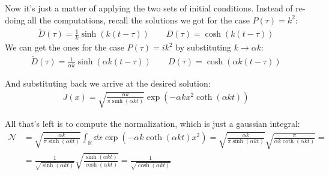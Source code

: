 \documentclass[../template.tex]{subfiles}
\begin{document}
\begin{exo}
    Now it's just a matter of applying the two sets of initial conditions. Instead of re-doing all the computations, recall the solutions we got for the case $P(\tau) = k^2$:
    \begin{align*}
        \tilde{D}(\tau) = \frac{1}{k} \sinh(k(t-\tau)) \qquad D(\tau) = \cosh(k(t-\tau))
    \end{align*}
    We can get the ones for the case $P(\tau) = ik^2$ by substituting $k \to \alpha k$:
    \begin{align*}
        \tilde{D}(\tau) = \frac{1}{\alpha k} \sinh(\alpha k(t- \tau)) \qquad D(\tau) = \cosh(\alpha k(t-\tau)) 
    \end{align*}

    And substituting back we arrive at the desired solution:
    \begin{align*}
        J(x) = \sqrt{\frac{\alpha k}{\pi \sinh(\alpha k t)}} \exp\left(-\alpha k x^2 \coth (\alpha k t) \right)
    \end{align*}

    All that's left is to compute the normalization, which is just a gaussian integral:
    \begin{align*}
        \mathcal{N}&=\sqrt{\frac{\alpha k}{\pi \sinh(\alpha k t)}} \int_{\mathbb{R}} \dd{x}    \exp(-\alpha k \coth(\alpha k t) x^2) = \sqrt{\frac{\alpha k}{\pi \sinh(\alpha k t)}} \sqrt{\frac{\pi}{\alpha k \coth(\alpha k t) } } =\\
        &= \frac{1}{\sqrt{\sinh(\alpha k t )}} \sqrt{\frac{\sinh(\alpha k t)}{\cosh(\alpha k t )} } = \frac{1}{\sqrt{\cosh (\alpha k t)}} 
    \end{align*}
\end{exo}
\end{document}
